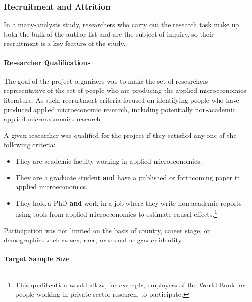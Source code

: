 \documentclass[
  letterpaper,
  DIV=11,
  numbers=noendperiod]{scrartcl}
\let\oldparagraph\paragraph
\renewcommand{\paragraph}[1]{\oldparagraph{#1}\mbox{}}
\begin{document}
\hypertarget{recruitment-and-attrition}{%
\subsubsection{Recruitment and
Attrition}\label{recruitment-and-attrition}}

In a many-analysts study, researchers who carry out the research task
make up both the bulk of the author list and are the subject of inquiry,
so their recruitment is a key feature of the study.

\hypertarget{researcher-qualifications}{%
\paragraph{Researcher Qualifications}\label{researcher-qualifications}}

The goal of the project organizers was to make the set of researchers
representative of the set of people who are producing the applied
microeconomics literature. As such, recruitment criteria focused on
identifying people who have produced applied microeconomic research,
including potentially non-academic applied microeconomics research.

A given researcher was qualified for the project if they satisfied any
one of the following criteria:

\begin{itemize}
\item
  They are academic faculty working in applied microeconomics.
\item
  They are a graduate student \textbf{and} have a published or
  forthcoming paper in applied microeconomics.
\item
  They hold a PhD \textbf{and} work in a job where they write
  non-academic reports using tools from applied microeconomics to
  estimate causal effects.\footnote{This qualification would allow, for
    example, employees of the World Bank, or people working in private
    sector research, to participate.}
\end{itemize}

Participation was not limited on the basis of country, career stage, or
demographics such as sex, race, or sexual or gender identity.

\hypertarget{sec-target-sample}{%
\paragraph{Target Sample Size}\label{sec-target-sample}}
\end{document}

